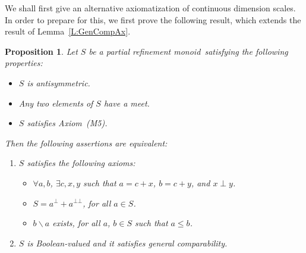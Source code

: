 \documentclass[psamsfonts,reqno]{memo-l}
\theoremstyle{plain}
\newtheorem{proposition}[lemma]{Proposition}
\theoremstyle{definition}
\theoremstyle{remark}
\numberwithin{equation}{section}
\newcommand{\sd}{\smallsetminus}
\newcommand{\prm}{partial refinement mon\-oid}
\begin{document}
We shall first give an alternative axiomatization of continuous dimension scales. In
order to prepare for this, we first prove the following result, which
extends the result of Lemma~\ref{L:GenCompAx}.

\begin{proposition}\label{P:AltAx}
Let $S$ be a \prm\ satisfying the following properties:
\begin{itemize}
\item[(1)] $S$  is antisymmetric.

\item[(2)] Any two elements of $S$ have a meet.

\item[(3)] $S$ satisfies Axiom~\textup{(M5)}.
\end{itemize}
Then the following assertions are equivalent:
\begin{enumerate}
\item $S$ satisfies the following axioms:
\begin{itemize}
\item[(N1)]
$\forall a,b$, $\exists c,x,y$ such that $a=c+x$, $b=c+y$, and $x\perp y$.

\item[(N2)] $S=a^\bot+a^{\bot\bot}$, for all $a\in S$.

\item[(N3)] $b\sd a$ exists, for all $a$, $b\in S$ such that $a\leq b$.
\end{itemize}

\item $S$ is Boolean-valued
 and it satisfies general
comparability.
\end{enumerate}
\end{proposition}
\end{document}
